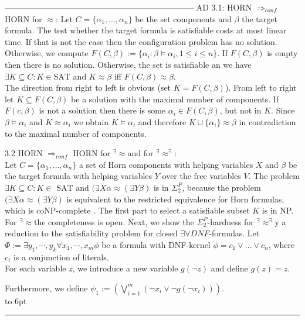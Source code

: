 \documentclass[12pt]{article}
\newcommand{\AEQB}{\mbox{$^\exists\!\!\approx^\exists$}}
\newcommand{\AEQ}{\mbox{$^\exists\!\!\approx$}}
\newenvironment{proof}{\parindent=0pt{\bf Proof: }}{
   \hspace*{\fill}\hbox to 6pt{\leaders\hrule width 6pt height 6pt\hfill}\par}
\begin{document}
---------------------------------------------------------------------
\begin{proof}
AD 3.1:  HORN  $\Rightarrow_{conf}$ HORN for $\approx$: Let $C=\{\alpha_1, \ldots, \alpha_n\}$ be the set components and $\beta$ the target formula. The test whether the target formula is satisfiable costs at most linear time. If that is not the case then
the configuration problem has no solution. Otherwise, we compute
$F(C, \beta) :=\{\alpha_i : \beta \models \alpha_i, 1 \leq i \leq n\}$. If $F(C, \beta)$ is empty then there is no solution. Otherwise, the set is satisfiable an we have
$\exists K \subseteq C: K \in \mbox{SAT and } K \approx \beta$ iff $F(C, \beta) \approx \beta$.\\
The direction from right to left is obvious (set $K= F(C, \beta)$). From left to right let $K \subseteq F(C,\beta)$
be a solution with the maximal number of components. If $F(c,\beta)$ is not a solution then there is some
$\alpha_i \in F(C, \beta)$, but not in $K$. Since $\beta \models \alpha_i$ and $K \approx \alpha_i$ we obtain
$K \models \alpha_i$ and therefore $K \cup\{\alpha_i\} \approx \beta$ in contradiction to the maximal
number of components.

3.2 HORN  $\Rightarrow_{conf}$ HORN for \AEQ and for \AEQB:\\
Let $C=\{\alpha_1, \ldots, \alpha_n\}$ a set of Horn components with helping variables $X$ and $\beta$ be the target formula with helping variables $Y$ over the free variables $V$.
The problem $\exists K \subseteq C: K \in  \mbox{ SAT and } (\exists X \alpha \approx (\exists Y \beta)$ is in $\Sigma^P_2$, because
the problem $(\exists X \alpha \approx (\exists Y \beta)$ is equivalent to the restricted equivalence for Horn formulas,
which is coNP-complete \cite{KBL}. The first part to select a satisfiable subset $K$ is in NP. \\

For \AEQ the completeness is open.
Next, we show the $\Sigma^P_2$-hardness for \AEQB y a reduction to the satisfiability problem for
closed $\exists \forall DNF$-formulas.
Let $\Phi:=\exists y_1,\cdots, y_k \forall x_1,\cdots, x_m \phi$ be a formula with DNF-kernel
$\phi = c_1 \vee \ldots \vee c_n$, where $c_i$ is a conjunction of literals.\\
For each variable $z$, we introduce a new variable $g(\neg z)$ and define $g(z)=z$.

Furthermore, we define $\psi_1:=\left(\bigvee_{i=1}^m (\neg x_i\vee \neg g(\neg x_i))\right)$.\\


\end{proof}
\end{document}
